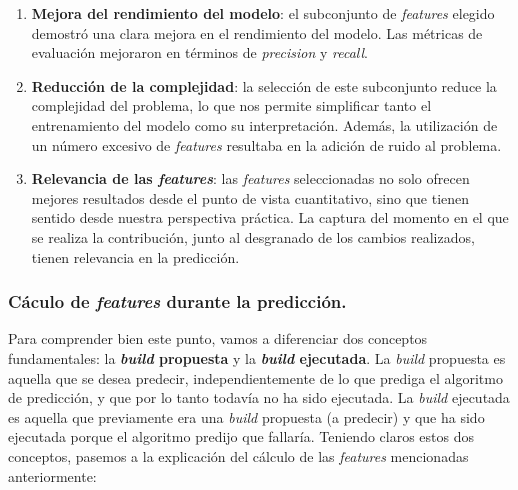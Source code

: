 \begin{enumerate}
	\item \textbf{Mejora del rendimiento del modelo}: el subconjunto de \textit{features} elegido
    demostró una clara mejora en el rendimiento del modelo. Las métricas de evaluación mejoraron
    en términos de \textit{precision} y \textit{recall}.\\

	\item \textbf{Reducción de la complejidad}: la selección de este subconjunto reduce la
    complejidad del problema, lo que nos permite simplificar tanto el entrenamiento del modelo
    como su interpretación. Además, la utilización de un número excesivo de \textit{features}
    resultaba en la adición de ruido al problema.\\

	\item \textbf{Relevancia de las \textit{features}}: las \textit{features} seleccionadas no
    solo ofrecen mejores resultados desde el punto de vista cuantitativo, sino que tienen sentido
    desde nuestra perspectiva práctica. La captura del momento en el que se realiza la
    contribución, junto al desgranado de los cambios realizados, tienen relevancia en
    la predicción.\\
\end{enumerate}

\subsubsection{Cáculo de \textit{features} durante la predicción.} Para comprender bien este
punto, vamos a diferenciar dos conceptos fundamentales: la \textbf{\textit{build} propuesta} y la
\textbf{\textit{build} ejecutada}. La \textit{build} propuesta es aquella que se desea predecir,
independientemente de lo que prediga el algoritmo de predicción, y que por lo tanto todavía no ha
sido ejecutada. La \textit{build} ejecutada es aquella que previamente era una \textit{build}
propuesta (a predecir) y que ha sido ejecutada porque el algoritmo predijo que fallaría. Teniendo
claros estos dos conceptos, pasemos a la explicación del cálculo de las \textit{features}
mencionadas anteriormente:

